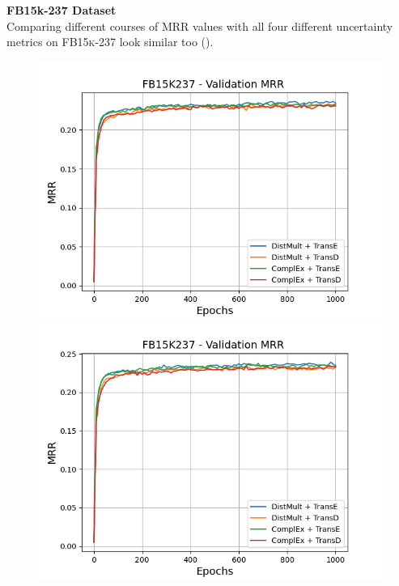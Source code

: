 \textbf{FB15k-237 Dataset}
\label{subsubsec:measures_fb15k237}\\
%
Comparing different courses of MRR values with all four different uncertainty metrics on \textsc{FB15k-237} look similar too ().
\begin{figure}[H]
    \centering
    \begin{minipage}{.5\textwidth}
      \centering
      \includegraphics[width=0.9\linewidth]{figures/results/gan_train/not_pretrained/uncertainty/max_distribution/entropy/fb15k237/1k_epochs/uncertainty_fb15k237_mrrs.png}
    \end{minipage}%
    \begin{minipage}{.5\textwidth}
      \centering
      \includegraphics[width=0.9\linewidth]{figures/results/gan_train/not_pretrained/uncertainty/max_distribution/least_confidence/fb15k237/uncertainty_fb15k237_mrrs.png}

\end{minipage}
\end{figure}
